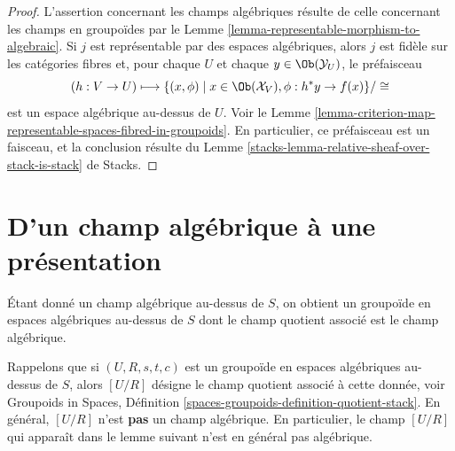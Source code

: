 \begin{proof}
L'assertion concernant les champs algébriques résulte de celle concernant les
champs en groupoïdes par le Lemme \ref{lemma-representable-morphism-to-algebraic}.
Si $j$ est représentable par des espaces algébriques, alors $j$ est
fidèle sur les catégories fibres et, pour chaque $U$ et chaque
$y \in \Ob(\mathcal{Y}_U)$, le préfaisceau
$$
(h : V \to U)
\longmapsto
\{(x, \phi) \mid x \in \Ob(\mathcal{X}_V), \phi : h^*y \to f(x)\}/\cong
$$
est un espace algébrique au-dessus de $U$. Voir le
Lemme \ref{lemma-criterion-map-representable-spaces-fibred-in-groupoids}.
En particulier, ce préfaisceau est un faisceau, et la conclusion résulte du
Lemme \ref{stacks-lemma-relative-sheaf-over-stack-is-stack} de Stacks.
\end{proof}



\section{D'un champ algébrique à une présentation}
\label{section-stack-to-presentation}

\noindent
Étant donné un champ algébrique au-dessus de $S$, on obtient un groupoïde en espaces algébriques
au-dessus de $S$ dont le champ quotient associé est le champ algébrique.

\medskip\noindent
Rappelons que si $(U, R, s, t, c)$ est un groupoïde en espaces algébriques au-dessus de $S$,
alors $[U/R]$ désigne le champ quotient associé à cette donnée, voir
Groupoids in Spaces,
Définition \ref{spaces-groupoids-definition-quotient-stack}.
En général, $[U/R]$ n'est {\bf pas} un champ algébrique. En particulier, le
champ $[U/R]$ qui apparaît dans le lemme suivant n'est en général pas
algébrique.

